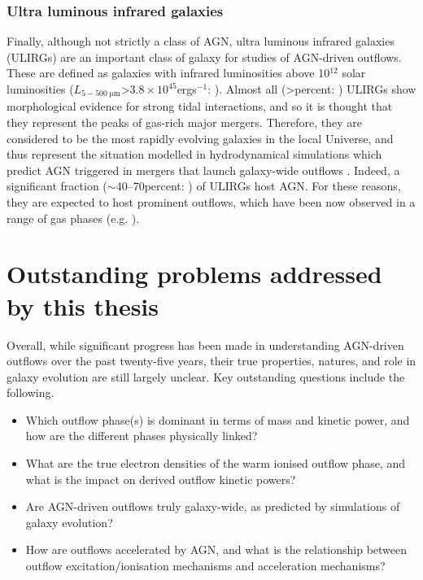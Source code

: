\subsubsection{Ultra luminous infrared galaxies}
\label{section: introduction: outflows: taxonomy_of_agn: ulirgs}

Finally, although not strictly a class of AGN, ultra luminous infrared galaxies (ULIRGs) are an important class of galaxy for studies of AGN-driven outflows. These are defined as galaxies with infrared luminosities above 10$^{12}$ solar luminosities ($L_\mathrm{5-500\;\mu{m}}$\;\textgreater\;$3.8\times10^{45}$\;erg\;s$^{-1}$: \citealt{Sanders1996}). Almost all (\textgreater{}\;per\;cent: \citealt{Veilleux2002}) ULIRGs show morphological evidence for strong tidal interactions, and so it is thought that they represent the peaks of gas-rich major mergers. Therefore, they are considered to be the most rapidly evolving galaxies in the local Universe, and thus represent the situation modelled in hydrodynamical simulations which predict AGN triggered in mergers that launch galaxy-wide outflows \citep{DiMatteo2005, Springel2005, Hopkins2008, Johansson2009}. Indeed, a significant fraction ($\sim$40--70\;per\;cent: \citealt{Kim1998, Veilleux2002, Nardini2010, AlonsoHerrero2012}) of ULIRGs host AGN. For these reasons, they are expected to host prominent outflows, which have been now observed in a range of gas phases (e.g. \citealt{Zaurin2013, Spence2018, Rose2018, Tadhunter2019, Lamperti2022}).

\section{Outstanding problems addressed by this thesis}
\label{section: introduction: outstanding problems}

Overall, while significant progress has been made in understanding AGN-driven outflows over the past twenty-five years, their true properties, natures, and role in galaxy evolution are still largely unclear. Key outstanding questions include the following. \\

\begin{itemize}
    \item Which outflow phase(s) is dominant in terms of mass and kinetic power, and how are the different phases physically linked?
    \item What are the true electron densities of the warm ionised outflow phase, and what is the impact on derived outflow kinetic powers?
    \item Are AGN-driven outflows truly galaxy-wide, as predicted by simulations of galaxy evolution?
    \item How are outflows accelerated by AGN, and what is the relationship between outflow excitation/ionisation mechanisms and acceleration mechanisms? \\
\end{itemize}

